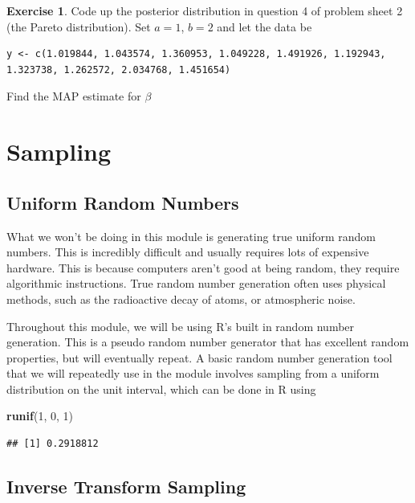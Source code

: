 \documentclass[
]{book}
\newenvironment{Shaded}{\begin{snugshade}}{\end{snugshade}}
\newcommand{\DecValTok}[1]{\textcolor[rgb]{0.00,0.00,0.81}{#1}}
\newcommand{\FunctionTok}[1]{\textcolor[rgb]{0.13,0.29,0.53}{\textbf{#1}}}
\newcommand{\NormalTok}[1]{#1}
\theoremstyle{definition}
\theoremstyle{definition}
\theoremstyle{definition}
\newtheorem{exercise}{Exercise}[chapter]
\theoremstyle{definition}
\theoremstyle{remark}
\begin{document}
\begin{exercise}
Code up the posterior distribution in question 4 of problem sheet 2 (the Pareto distribution). Set \(a = 1\), \(b = 2\) and let the data be

\begin{verbatim}
y <- c(1.019844, 1.043574, 1.360953, 1.049228, 1.491926, 1.192943, 1.323738, 1.262572, 2.034768, 1.451654)
\end{verbatim}

Find the MAP estimate for \(\beta\)
\end{exercise}

\hypertarget{sampling}{%
\chapter{Sampling}\label{sampling}}

\hypertarget{uniform-random-numbers}{%
\section{Uniform Random Numbers}\label{uniform-random-numbers}}

What we won't be doing in this module is generating true uniform random numbers. This is incredibly difficult and usually requires lots of expensive hardware. This is because computers aren't good at being random, they require algorithmic instructions. True random number generation often uses physical methods, such as the radioactive decay of atoms, or atmospheric noise.

Throughout this module, we will be using R's built in random number generation. This is a pseudo random number generator that has excellent random properties, but will eventually repeat. A basic random number generation tool that we will repeatedly use in the module involves sampling from a uniform distribution on the unit interval, which can be done in R using

\begin{Shaded}
\begin{Highlighting}[]
\FunctionTok{runif}\NormalTok{(}\DecValTok{1}\NormalTok{, }\DecValTok{0}\NormalTok{, }\DecValTok{1}\NormalTok{)}
\end{Highlighting}
\end{Shaded}

\begin{verbatim}
## [1] 0.2918812
\end{verbatim}

\hypertarget{inverse-transform-sampling}{%
\section{Inverse Transform Sampling}\label{inverse-transform-sampling}}
\end{document}
